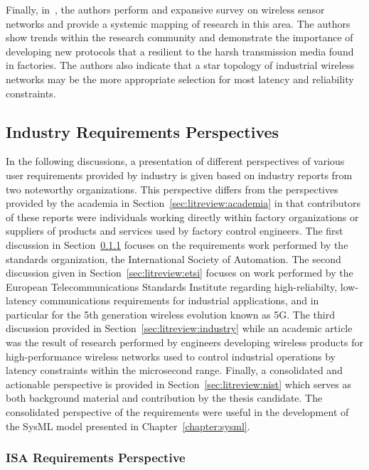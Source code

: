 Finally, in~\cite{QUEIROZ201796}, the authors perform and expansive survey on wireless sensor networks and provide a systemic mapping of research in this area.  The authors show trends within the research community and demonstrate the importance of developing new protocols that a resilient to the harsh transmission media found in factories.  The authors also indicate that a star topology of industrial wireless networks may be the more appropriate selection for most latency and reliability constraints.


\subsection{Industry Requirements Perspectives}

In the following discussions, a presentation of different perspectives of various user requirements provided by industry is given based on industry reports from two noteworthy organizations.  This perspective differs from the perspectives provided by the academia in Section~\ref{sec:litreview:academia} in that contributors of these reports were individuals working directly within factory organizations or suppliers of products and services used by factory control engineers.  The first discussion in Section~\ref{sec:litreview:isa} focuses on the requirements work performed by the standards organization, the International Society of Automation.  The second discussion given in Section~\ref{sec:litreview:etsi} focuses on work performed by the European Telecommunications Standards Institute regarding high-reliabilty, low-latency communications requirements for industrial applications, and in particular for the 5th generation wireless evolution known as 5G.  The third discussion provided in Section~\ref{sec:litreview:industry} while an academic article was the result of research performed by engineers developing wireless products for high-performance wireless networks used to control industrial operations by latency constraints within the microsecond range.  Finally, a consolidated and actionable perspective is provided in Section~\ref{sec:litreview:nist} which serves as both background material and contribution by the thesis candidate.  The consolidated perspective of the requirements were useful in the development of the SysML model presented in Chapter~\ref{chapter:sysml}.

\subsubsection{ISA Requirements Perspective}\label{sec:litreview:isa}

